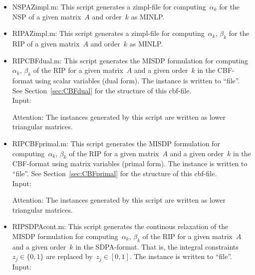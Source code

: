 \documentclass[11pt,a4paper]{article}
\newenvironment{dense_itemize}{%
  \begin{list}{$\circ$}%
    {\setlength{\topsep}{1mm}%
      \setlength{\partopsep}{0mm}%
      \setlength{\parskip}{0mm}%
      \setlength{\parsep}{0mm}%
      \setlength{\itemsep}{0mm}%
      \setlength{\labelwidth}{4mm}%
      \setlength{\leftmargin}{0mm}%
      \addtolength{\leftmargin}{\labelwidth}%
      \addtolength{\leftmargin}{\labelsep}%
      \setlength{\itemindent}{0mm}}}%
  {\end{list}}
\theoremstyle{definition}
\begin{document}
\begin{itemize}
\item \textsf{NSPAZimpl.m}: This script generates a zimpl-file for
  computing~$\alpha_k$ for the NSP of a given matrix~$A$ and order~$k$ as
  MINLP.
\item \textsf{RIPAZimpl.m}: This script generates a zimpl-file for
  computing~$\alpha_k,\, \beta_k$ for the RIP of a given matrix~$A$ and
  order~$k$ as MINLP.
\item \textsf{RIPCBFdual.m}: This script generates the MISDP formulation
  for computing~$\alpha_k,\, \beta_k$ of the RIP for a given matrix~$A$ and
  a given order~$k$ in the CBF-format using scalar variables (dual
  form). The instance is written to ``file''. See Section~\ref{sec:CBFdual}
  for the structure of
  this cbf-file. \\
  Input:
  Attention: The instances generated by this script are written as lower
  triangular matrices.
\item \textsf{RIPCBFprimal.m}: This script generates the MISDP formulation
  for computing~$\alpha_k,\, \beta_k$ of the RIP for a given matrix~$A$ and
  a given order~$k$ in the CBF-format using matrix variables (primal
  form). The instance is written to ``file''. See
  Section~\ref{sec:CBFprimal} for the structure of
  this cbf-file. \\
  Input:
  Attention: The instances generated by this script are written as lower
  triangular matrices. 
\item \textsf{RIPSDPAcont.m}: This script
  generates the continous relaxation of the MISDP formulation for
  computing~$\alpha_k,\, \beta_k$ of the RIP for a given matrix~$A$ and a
  given order~$k$ in the SDPA-format. That is, the integral
  constraints~$z_j \in \{0,1\}$ are replaced by~$z_j \in [0,1]$.  The
  instance is written to ``file''. \\
  Input:


\end{itemize}
\end{document}
